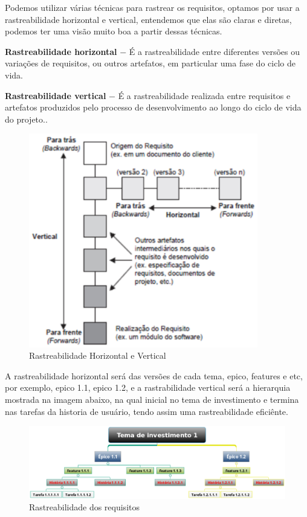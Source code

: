	Podemos utilizar várias técnicas para rastrear os requisitos, optamos por usar a rastreabilidade horizontal e vertical, entendemos
  que elas são claras e diretas, podemos ter uma visão muito boa a partir dessas técnicas.

	\textbf{Rastreabilidade horizontal} $-$ É a rastreabilidade entre diferentes versões ou variações de requisitos, ou outros artefatos,
  em particular uma fase do ciclo de vida\cite{tese_doutorado}.

	\textbf{Rastreabilidade vertical} $-$ É a rastreabilidade realizada entre requisitos e artefatos produzidos pelo processo de
  desenvolvimento ao longo do ciclo de vida do projeto.\cite{tese_doutorado}.

  \begin{figure}[!h]
    \centering
    \includegraphics[width=10cm, keepaspectratio=true]{figuras/gerenciamento/rastreabilidade.eps}
    \caption{Rastreabilidade Horizontal e Vertical}
  \end{figure}

  A rastreabilidade horizontal será das versões de cada tema, epico, features e etc, por exemplo, epico 1.1, epico 1.2, e a
  rastrabilidade vertical será a hierarquia mostrada na imagem abaixo, na qual inicial no tema de investimento e termina nas
  tarefas da historia de usuário, tendo assim uma rastreabilidade eficiênte.

  \begin{figure}[!h]
    \centering
    \includegraphics[width=15cm, keepaspectratio=true]{figuras/gerenciamento/temas.eps}
    \caption{Rastreabilidade dos requisitos}
  \end{figure}

